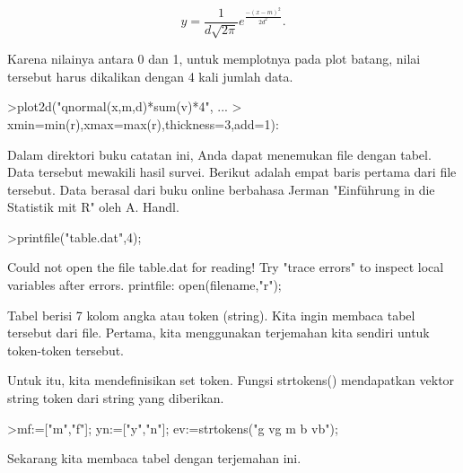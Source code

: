 \documentclass[a4paper,10pt]{article}
\begin{document}
\begin{eulernotebook}
\begin{eulercomment}
\end{eulercomment}
\begin{eulerformula}
\[
y=\frac{1}{d\sqrt{2\pi}}e^{\frac{-(x-m)^2}{2d^2}}.
\]
\end{eulerformula}
\begin{eulercomment}
Karena nilainya antara 0 dan 1, untuk memplotnya pada plot batang,
nilai tersebut harus dikalikan dengan 4 kali jumlah data.
\end{eulercomment}
\begin{eulerprompt}
>plot2d("qnormal(x,m,d)*sum(v)*4", ...
>  xmin=min(r),xmax=max(r),thickness=3,add=1):
\end{eulerprompt}
\begin{eulercomment}
Dalam direktori buku catatan ini, Anda dapat menemukan file dengan
tabel. Data tersebut mewakili hasil survei. Berikut adalah empat baris
pertama dari file tersebut. Data berasal dari buku online berbahasa
Jerman "Einführung in die Statistik mit R" oleh A. Handl.
\end{eulercomment}
\begin{eulerprompt}
>printfile("table.dat",4);
\end{eulerprompt}
\begin{euleroutput}
  Could not open the file
  table.dat
  for reading!
  Try "trace errors" to inspect local variables after errors.
  printfile:
      open(filename,"r");
\end{euleroutput}
\begin{eulercomment}
Tabel berisi 7 kolom angka atau token (string). Kita ingin membaca
tabel tersebut dari file. Pertama, kita menggunakan terjemahan kita
sendiri untuk token-token tersebut.

Untuk itu, kita mendefinisikan set token. Fungsi strtokens()
mendapatkan vektor string token dari string yang diberikan.
\end{eulercomment}
\begin{eulerprompt}
>mf:=["m","f"]; yn:=["y","n"]; ev:=strtokens("g vg m b vb");
\end{eulerprompt}
\begin{eulercomment}
Sekarang kita membaca tabel dengan terjemahan ini.


\end{eulercomment}
\end{eulernotebook}
\end{document}
